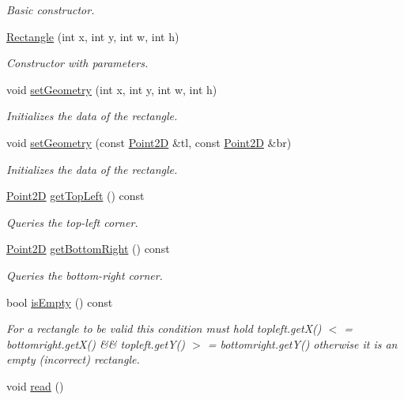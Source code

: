 \begin{DoxyCompactItemize}
\begin{DoxyCompactList}\small\item\em Basic constructor. \end{DoxyCompactList}\item 
\hyperlink{classRectangle_a1546993e9fc10b8d128f4a85ed68c653}{Rectangle} (int x, int y, int w, int h)
\begin{DoxyCompactList}\small\item\em Constructor with parameters. \end{DoxyCompactList}\item 
void \hyperlink{classRectangle_a31c4b9fc0d1ddf912f114da494e50205}{set\+Geometry} (int x, int y, int w, int h)
\begin{DoxyCompactList}\small\item\em Initializes the data of the rectangle. \end{DoxyCompactList}\item 
void \hyperlink{classRectangle_af8d143717fa47878690b12705a687b38}{set\+Geometry} (const \hyperlink{classPoint2D}{Point2D} \&tl, const \hyperlink{classPoint2D}{Point2D} \&br)
\begin{DoxyCompactList}\small\item\em Initializes the data of the rectangle. \end{DoxyCompactList}\item 
\hyperlink{classPoint2D}{Point2D} \hyperlink{classRectangle_a6aeadc63b82f3c2efbbbd57041fb32e3}{get\+Top\+Left} () const 
\begin{DoxyCompactList}\small\item\em Queries the top-\/left corner. \end{DoxyCompactList}\item 
\hyperlink{classPoint2D}{Point2D} \hyperlink{classRectangle_aa08d26c1548936bf1e6365f08f35cb27}{get\+Bottom\+Right} () const 
\begin{DoxyCompactList}\small\item\em Queries the bottom-\/right corner. \end{DoxyCompactList}\item 
bool \hyperlink{classRectangle_a85caa6e3772b83a302ff9f47d587dd83}{is\+Empty} () const 
\begin{DoxyCompactList}\small\item\em For a rectangle to be valid this condition must hold topleft.\+get\+X() $<$ = bottomright.\+get\+X() \&\& topleft.\+get\+Y() $>$ = bottomright.\+get\+Y() otherwise it is an empty (incorrect) rectangle. \end{DoxyCompactList}\item 
void \hyperlink{classRectangle_af6973ed3094f9dbabeadb071772fa76d}{read} ()\hypertarget{classRectangle_af6973ed3094f9dbabeadb071772fa76d}{}\label{classRectangle_af6973ed3094f9dbabeadb071772fa76d}


\end{DoxyCompactItemize}
